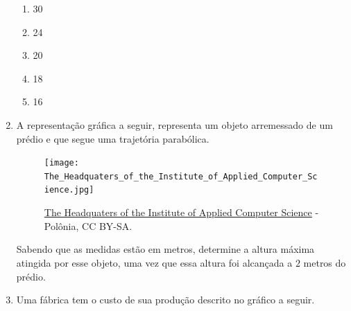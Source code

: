 \begin{enumerate}
\begin{figure}[H]
\centering

\end{figure}
\begin{enumerate}
\item 30
\item 24
\item 20
\item 18
\item 16
\end{enumerate}

\item A representação gráfica a seguir, representa um objeto arremessado de um prédio e que segue uma trajetória parabólica.

\begin{figure}[H]
\centering
\capstart

\noindent\texttt{[image: The\_Headquaters\_of\_the\_Institute\_of\_Applied\_Computer\_Science.jpg]}
\caption{\href{https://commons.wikimedia.org/wiki/File:The\_Headquaters\_of\_the\_Institute\_of\_Applied\_Computer\_Science.jpg}{The Headquaters of the Institute of Applied Computer Science} - Polônia, CC BY-SA.}\label{\detokenize{AF209-E:id2}}\end{figure}

Sabendo que as medidas estão em metros, determine a altura máxima atingida por esse objeto, uma vez que essa altura foi alcançada a \(2\) metros do prédio.

\needspace{10em}
\item Uma fábrica tem o custo de sua produção descrito no gráfico a seguir.
\begin{figure}[H]
\centering

\end{figure}


\end{enumerate}

